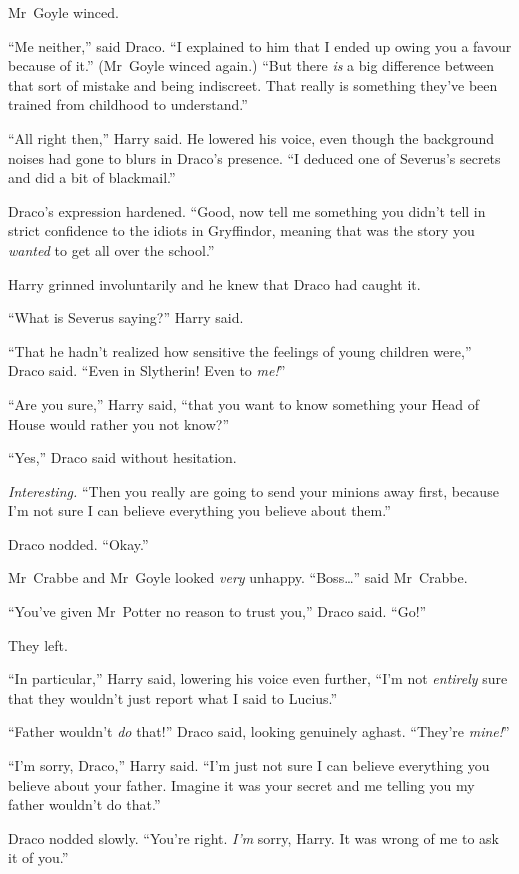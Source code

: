 Mr~Goyle winced.

“Me neither,” said Draco. “I explained to him that I ended up owing you a favour because of it.” (Mr~Goyle winced again.) “But there \emph{is} a big difference between that sort of mistake and being indiscreet. That really is something they’ve been trained from childhood to understand.”

“All right then,” Harry said. He lowered his voice, even though the background noises had gone to blurs in Draco’s presence. “I deduced one of Severus’s secrets and did a bit of blackmail.”

Draco’s expression hardened. “Good, now tell me something you didn’t tell in strict confidence to the idiots in Gryffindor, meaning that was the story you \emph{wanted} to get all over the school.”

Harry grinned involuntarily and he knew that Draco had caught it.

“What is Severus saying?” Harry said.

“That he hadn’t realized how sensitive the feelings of young children were,” Draco said. “Even in Slytherin! Even to \emph{me!}”

“Are you sure,” Harry said, “that you want to know something your Head of House would rather you not know?”

“Yes,” Draco said without hesitation.

\emph{Interesting.} “Then you really are going to send your minions away first, because I’m not sure I can believe everything you believe about them.”

Draco nodded. “Okay.”

Mr~Crabbe and Mr~Goyle looked \emph{very} unhappy. “Boss…” said Mr~Crabbe.

“You’ve given Mr~Potter no reason to trust you,” Draco said. “Go!”

They left.

“In particular,” Harry said, lowering his voice even further, “I’m not \emph{entirely} sure that they wouldn’t just report what I said to Lucius.”

“Father wouldn’t \emph{do} that!” Draco said, looking genuinely aghast. “They’re \emph{mine!}”

“I’m sorry, Draco,” Harry said. “I’m just not sure I can believe everything you believe about your father. Imagine it was your secret and me telling you my father wouldn’t do that.”

Draco nodded slowly. “You’re right. \emph{I’m} sorry, Harry. It was wrong of me to ask it of you.”

